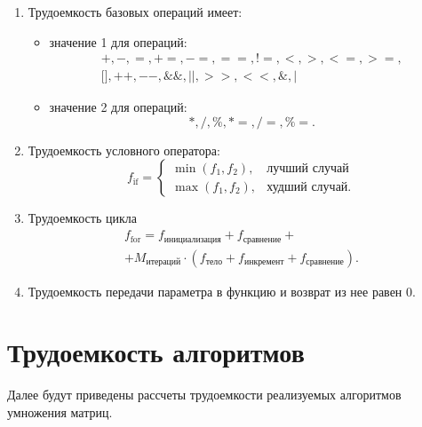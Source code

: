 \begin{enumerate}
    \item Трудоемкость базовых операций имеет:
    \begin{itemize}
        \item значение 1 для операций:
        \begin{equation}
            \begin{gathered}
                +, -, =, +=, -=, ==, !=, <, >, <=, >=, \\ 
                \text{[]}, ++, --, \&\&, ||, >>, <<, \&, |
            \end{gathered}
        \end{equation}
        \item значение 2 для операций:
        \begin{equation}
            *, /, \%, *=, /=, \%=.
        \end{equation}
    \end{itemize}
    \item Трудоемкость условного оператора:
    \begin{equation}
        f_{\text{if}} =
        \begin{cases}
            \min({f_1, f_2}), & \text{лучший случай} \\
            \max({f_1, f_2}), & \text{худший случай}.
        \end{cases}
    \end{equation}
    \item Трудоемкость цикла
    \begin{equation}
        \begin{gathered}
            f_{\text{for}} = f_{\text{инициализация}} + f_{\text{сравнение}} + \\
            + M_{\text{итераций}} \cdot (f_{\text{тело}} + f_{\text{инкремент}} + f_{\text{сравнение}}).
        \end{gathered} 
    \end{equation}
    \item Трудоемкость передачи параметра в функцию и возврат из нее равен 0.
\end{enumerate}

\section{Трудоемкость алгоритмов}

Далее будут приведены рассчеты трудоемкости реализуемых алгоритмов умножения матриц.

